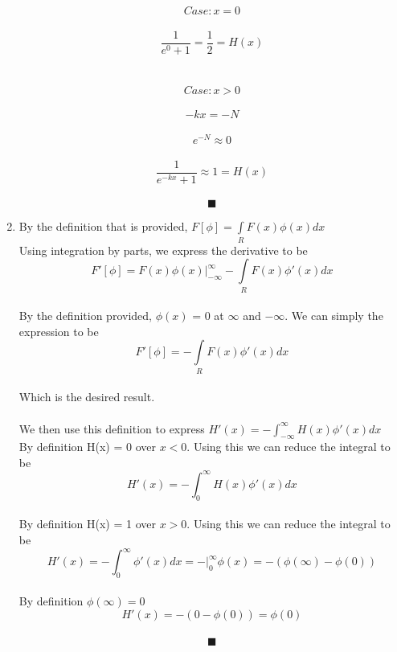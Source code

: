 \documentclass{article}
\begin{document}
\begin{enumerate}
		$$Case:x = 0$$\\
		$$\frac{1}{e^{0} + 1} = \frac{1}{2} = H(x)$$ \\ \\

		$$Case:x > 0$$\\
		$$- kx= -N$$\\
		$$e^{-N}  \approx 0$$\\
		$$\frac{1}{e^{-kx} + 1} \approx 1 = H(x)$$\\ 

	           $$\blacksquare$$

	\item 
		By the definition that is provided,  $F[\phi] = \int\limits_R F(x)\phi(x)d x$ \\
		Using integration by parts, we express the derivative to be \\
		$$F'[\phi]=  F(x)\phi(x) \Big|_{-\infty}^\infty -  \int\limits_R F(x)\phi'(x)d x$$ \\
		By the definition provided, $\phi(x)$ = 0 at $\infty$ and $-\infty$. We can simply the expression to be\\
		$$F'[\phi]= -  \int\limits_R F(x)\phi'(x)d x$$ \\
		Which is the desired result.\\ \\

		We then use this definition to express $ H'(x) = - \int_{-\infty}^\infty H(x)\phi'(x)d x$ \\
		By definition H(x) = 0 over $x<0$. Using this we can reduce the integral to be\\
		$$H'(x) = - \int_{0}^\infty H(x)\phi'(x)d x$$\\
		By definition H(x) = 1 over $x>0$. Using this we can reduce the integral to be\\
		$$H'(x) = - \int_{0}^\infty\phi'(x)d x = - \Big|_{0}^\infty \phi(x) = - (\phi(\infty) - \phi(0))$$\\
		By definition $ \phi(\infty) = 0$\\
		$$H'(x) =  - (0 - \phi(0)) = \phi(0)$$\\
	           $$\blacksquare$$		




	



    \end{enumerate}
\vspace{1cm}
\end{document}
